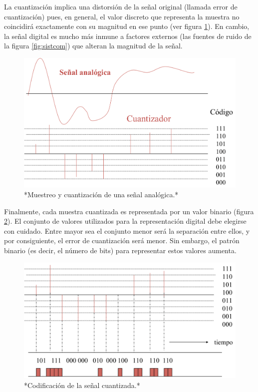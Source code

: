 \documentclass[
]{book}
\begin{document}
La cuantización implica una distorsión de la señal original (llamada error de cuantización) pues, en general, el valor discreto que representa la muestra no coincidirá exactamente con su magnitud en ese punto (ver figura \ref{fig:mu-y-cuant}). En cambio, la señal digital es mucho más inmune a factores externos (las fuentes de ruido de la figura \ref{fig:sistcom}) que alteran la magnitud de la señal.

\begin{figure}

{\centering \includegraphics{figuras/c1/muestycuant-1} 

}

\caption{*Muestreo y cuantización de una señal analógica.*}\label{fig:mu-y-cuant}
\end{figure}

Finalmente, cada muestra cuantizada es representada por un valor binario (figura \ref{fig:coddig}). El conjunto de valores utilizados para la representación digital debe elegirse con cuidado. Entre mayor sea el conjunto menor será la separación entre ellos, y por consiguiente, el error de cuantización será menor. Sin embargo, el patrón binario (es decir, el número de bits) para representar estos valores aumenta.

\begin{figure}

{\centering \includegraphics{figuras/c1/codifica-1} 

}

\caption{*Codificación de la señal cuantizada.*}\label{fig:coddig}
\end{figure}
\end{document}
